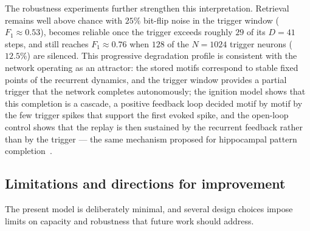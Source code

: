 \documentclass{scrartcl}
\newcommand{\citep}[1]{\parencite{#1}}
\begin{document}
The robustness experiments further strengthen this interpretation. Retrieval remains well above chance with $25\%$ bit-flip noise in the trigger window ($F_1 \approx 0.53$), becomes reliable once the trigger exceeds roughly $29$ of its $D = 41$ steps, and still reaches $F_1 \approx 0.76$ when $128$ of the $N = 1024$ trigger neurons ($12.5\%$) are silenced. This progressive degradation profile is consistent with the network operating as an attractor: the stored motifs correspond to stable fixed points of the recurrent dynamics, and the trigger window provides a partial trigger that the network completes autonomously; the ignition model shows that this completion is a cascade, a positive feedback loop decided motif by motif by the few trigger spikes that support the first evoked spike, and the open-loop control shows that the replay is then sustained by the recurrent feedback rather than by the trigger --- the same mechanism proposed for hippocampal pattern completion~\citep{Villette2015}.

\subsection{Limitations and directions for improvement}

The present model is deliberately minimal, and several design choices impose limits on capacity and robustness that future work should address.
\end{document}
